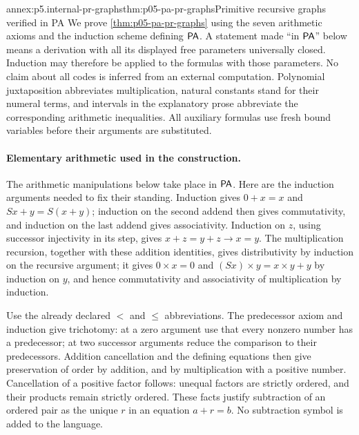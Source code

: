 
\begin{annexitem}{annex:p5.internal-pr-graphs}{thm:p05-pa-pr-graphs}{Primitive recursive graphs verified in PA}
We prove \cref{thm:p05-pa-pr-graphs} using the seven arithmetic axioms and
the induction scheme defining \(\mathsf{PA}\).  A statement made ``in \(\mathsf{PA}\)''
below means a derivation with all its displayed free parameters universally
closed.  Induction may therefore be applied to the formulas with those
parameters.  No claim about all codes is inferred from an external computation.
Polynomial juxtaposition abbreviates multiplication, natural constants stand
for their numeral terms, and intervals in the explanatory prose abbreviate
the corresponding arithmetic inequalities.  All auxiliary formulas use
fresh bound variables before their arguments are substituted.

\paragraph{Elementary arithmetic used in the construction.}
The arithmetic manipulations below take place in \(\mathsf{PA}\).  Here are the
induction arguments needed to fix their standing.  Induction gives
\(0+x=x\) and \(Sx+y=S(x+y)\); induction on the second addend then gives
commutativity, and induction on the last addend gives associativity.
Induction on \(z\), using successor injectivity in its step, gives
\(x+z=y+z\to x=y\).  The multiplication recursion, together with these
addition identities, gives distributivity by induction on the recursive
argument; it gives \(0\times x=0\) and
\((Sx)\times y=x\times y+y\) by induction on \(y\), and hence
commutativity and associativity of multiplication by induction.

Use the already declared \(<\) and \(\leq\) abbreviations.  The predecessor
axiom and induction give trichotomy: at a zero argument use that every
nonzero number has a predecessor; at two successor arguments reduce the
comparison to their predecessors.  Addition cancellation and the defining
equations then give preservation of order by addition, and by multiplication
with a positive number.  Cancellation of a positive factor follows: unequal
factors are strictly ordered, and their products remain strictly ordered.
These facts justify subtraction of an ordered pair as the unique \(r\)
in an equation \(a+r=b\).  No subtraction symbol is added to the language.


\end{annexitem}
